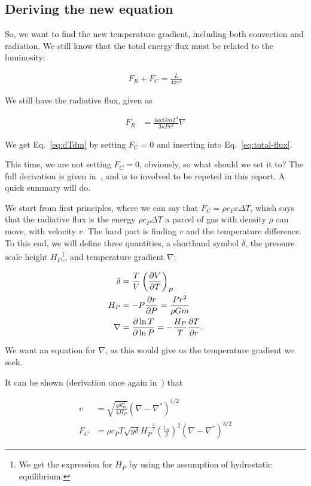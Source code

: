 \documentclass[11pt,twocolumn]{article}
\begin{document}
\subsection{Deriving the new equation}

So, we want to find the new temperature gradient, including both convection and radiation. We still know that the total energy flux must be related to the luminosity:

\begin{align}
    F_R + F_C = \frac{L}{4\pi r^2}\label{eq:total-flux}
\end{align}

We still have the radiative flux, given as

\begin{align}
    F_R &= \frac{4acGmT^4}{3\kappa P r^2}\nabla \label{eq:radiative-flux}
\end{align}

We get Eq.~\eqref{eq:dTdm} by setting $F_C = 0$ and inserting into Eq.~\eqref{eq:total-flux}.

This time, we are not setting $F_C = 0$, obviously, so what should we set it to? The full derivation is given in~\cite{lecture-notes}, and is to involved to be repeted in this report. A quick summary will do.

We start from first principles, where we can say that $F_C = \rho c_P v \Delta T$, which says that the radiative flux is the energy $\rho c_P \Delta T$ a parcel of gas with density $\rho$ can move, with velocity $v$. The hard part is finding $v$ and the temperature difference. To this end, we will define three quantities, a shorthand symbol $\delta$, the pressure scale height $H_P$\footnote{We get the expression for $H_P$ by using the assumption of hydrostatic equilibrium.}, and temperature gradient $\nabla $:

\begin{align}
    \delta &= \frac{T}{V}\left( \frac{\partial V}{\partial T} \right)_P\label{eq:delta-def}\\
    H_P &= -P\frac{\partial r}{\partial P} = \frac{P r^2}{\rho Gm} \label{eq:Hp-def}\\
    \nabla &= \frac{\partial \ln T}{\partial \ln P} = -\frac{H_P}{T}\frac{\partial T}{\partial r}\label{eq:grad-def}.
\end{align}

We want an equation for $\nabla$, as this would give us the temperature gradient we seek.

It can be shown (derivation once again in~\cite{lecture-notes}) that

\begin{align}
    v &= \sqrt{\frac{g\delta l_m^2}{4H_P}}(\nabla - \nabla^*)^{1/2}\label{eq:v}\\
    F_C &= \rho c_P T\sqrt{g\delta}H_P^{-\frac{3}{2}}\left(\frac{l_m}{2}\right)^2 (\nabla - \nabla^*)^{3/2}\label{eq:Fc-expression}
\end{align}
\end{document}

